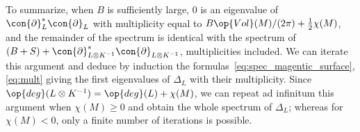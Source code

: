 To summarize, when $B$ is sufficiently large, $0 $ is an eigenvalue of $\con{\partial}^*_L \con{\partial}_L$ with multiplicity equal to $ B
\op{Vol}(M) / (2 \pi) + \frac{1}{2} \chi(M)$, and the remainder of the spectrum is identical with the spectrum of $(B+S) + \con{\partial}^*_{L\otimes K^{-1}}
\con{\partial}_{L\otimes K^{-1}}$, multiplicities included. We can iterate this argument and deduce by induction the formulas~\eqref{eq:spec_magentic_surface}, \eqref{eq:mult} giving the first eigenvalues of $\Delta_{L}$ with their multiplicity. Since $\op{deg} (L \otimes K^{-1}) = \op{deg} (L) + \chi (M)$, we can repeat ad infinitum this argument when $\chi (M) \geqslant 0$ and obtain the whole spectrum of $\Delta_L$; whereas for $\chi (M) <0$, only a finite number of iterations is possible.

